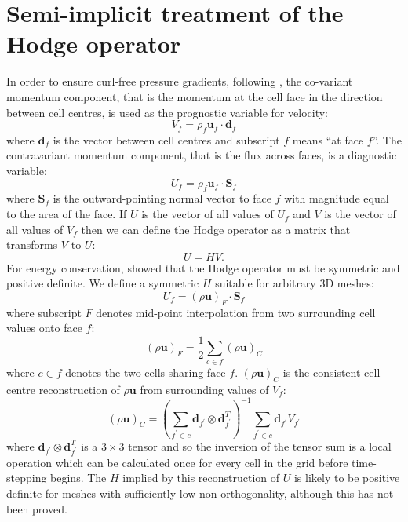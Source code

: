 \section{Semi-implicit treatment of the Hodge operator\label{appx:SI}}

In order to ensure curl-free pressure gradients, following \citet{weller-shahrokhi2014},
the co-variant momentum component, that is the momentum at the cell
face in the direction between cell centres, is used as the prognostic
variable for velocity:
\begin{equation}
V_{f}=\rho_{f}\mathbf{u}_{f}\cdot\mathbf{d}_{f}
\end{equation}
where $\mathbf{d}_{f}$ is the vector between cell centres and subscript
$f$ means ``at face $f$''. The contravariant momentum component,
that is the flux across faces, is a diagnostic variable:
\begin{equation}
U_{f}=\rho_{f}\mathbf{u}_{f}\cdot\mathbf{S}_{f}
\end{equation}
where $\mathbf{S}_{f}$ is the outward-pointing normal vector to face
$f$ with magnitude equal to the area of the face. If $U$ is the
vector of all values of $U_{f}$ and $V$ is the vector of all values
of $V_{f}$ then we can define the Hodge operator as a matrix that
transforms $V$ to $U$:
\begin{equation}
U=HV.
\end{equation}
For energy conservation, \citet{TC12} showed that the Hodge operator
must be symmetric and positive definite. We define a symmetric $H$
suitable for arbitrary 3D meshes:
\begin{equation}
U_{f}=(\rho\mathbf{u})_{F}\cdot\mathbf{S}_{f}
\end{equation}
where subscript $F$ denotes mid-point interpolation from two surrounding
cell values onto face $f$:
\begin{equation}
(\rho\mathbf{u})_{F}=\frac{1}{2}\sum_{c\in f}(\rho\mathbf{u})_{C}
\end{equation}
where $c\in f$ denotes the two cells sharing face $f$. $(\rho\mathbf{u})_{C}$
is the consistent cell centre reconstruction of $\rho\mathbf{u}$
from surrounding values of $V_{f}$:
\[
(\rho\mathbf{u})_{C}=\left(\sum_{f^{\prime}\in c}\mathbf{d}_{f^{\prime}}\otimes\mathbf{d}_{f^{\prime}}^{T}\right)^{-1}\sum_{f^{\prime}\in c}\mathbf{d}_{f^{\prime}}V_{f^{\prime}}
\]
where $\mathbf{d}_{f^{\prime}}\otimes\mathbf{d}_{f^{\prime}}^{T}$
is a $3\times3$ tensor and so the inversion of the tensor sum is
a local operation which can be calculated once for every cell in the
grid before time-stepping begins. The $H$ implied by this reconstruction
of $U$ is likely to be positive definite for meshes with sufficiently
low non-orthogonality, although this has not been proved. 

